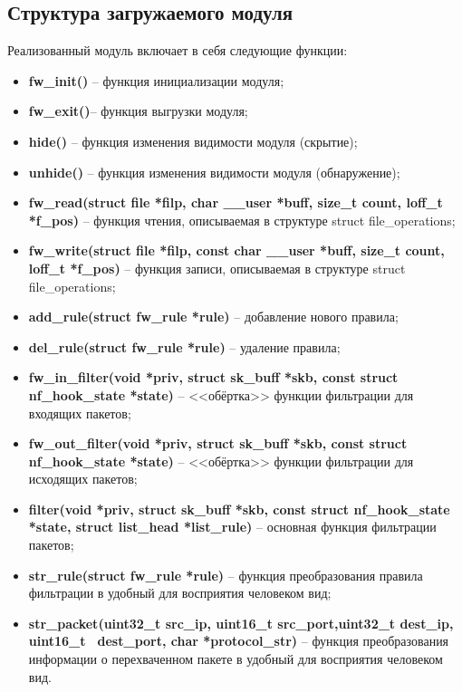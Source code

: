\subsection{Структура загружаемого модуля}
Реализованный модуль включает в себя следующие функции:
\begin{itemize}
	\item \textbf{fw\_init()} -- функция инициализации модуля;
	
	\item \textbf{fw\_exit()}-- функция выгрузки модуля;
	
	\item \textbf{hide()} -- функция изменения видимости модуля (скрытие);
	
	\item \textbf{unhide()} -- функция изменения видимости модуля (обнаружение);
	
	\item \textbf{fw\_read(struct file *filp, char \_\_user *buff, size\_t count, loff\_t *f\_pos)} -- функция чтения, описываемая в структуре struct file\_operations;
	
	\item \textbf{fw\_write(struct file *filp, const char \_\_user *buff, size\_t count, loff\_t *f\_pos)} -- функция записи, описываемая в структуре struct file\_operations;
	
	\item \textbf{add\_rule(struct fw\_rule *rule)} -- добавление нового правила;
	
	\item \textbf{del\_rule(struct fw\_rule *rule)} -- удаление правила;
	
	\item \textbf{fw\_in\_filter(void *priv, struct sk\_buff *skb, const struct nf\_hook\_state *state)} -- <<обёртка>> функции фильтрации для входящих пакетов;
	
	\item \textbf{fw\_out\_filter(void *priv, struct sk\_buff *skb, const struct nf\_hook\_state *state)} -- <<обёртка>> функции фильтрации для исходящих пакетов;
	
	\item \textbf{filter(void *priv, struct sk\_buff *skb, const struct nf\_hook\_state *state,
	struct list\_head *list\_rule)} -- основная функция фильтрации пакетов;
	
	\item \textbf{str\_rule(struct fw\_rule *rule)} -- функция преобразования правила фильтрации в удобный для восприятия человеком вид;
	
	\item \textbf{str\_packet(uint32\_t src\_ip, uint16\_t src\_port,uint32\_t dest\_ip, uint16\_t \, dest\_port, char *protocol\_str)} -- функция преобразования информации о перехваченном пакете в удобный для восприятия человеком вид.
\end{itemize}
